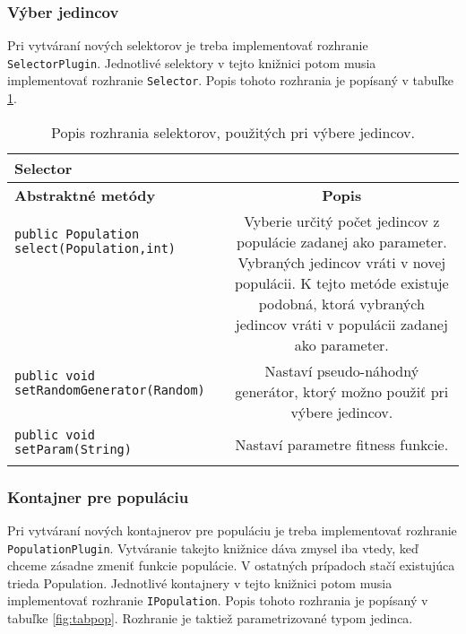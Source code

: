\subsubsection*{Výber jedincov}
Pri vytváraní nových selektorov je treba implementovať rozhranie \verb|SelectorPlugin|. Jednotlivé selektory v tejto knižnici potom musia implementovať rozhranie \verb|Selector|. Popis tohoto rozhrania je popísaný v tabuľke \ref{fig:tabsel}.

\begin{table}
\centering
\begin{tabular}{|l|c|}
\hline
\textbf{Selector} & \\
\hline\hline
\textbf{Abstraktné metódy} & \textbf{Popis} \\
\hline
\verb|public Population select(Population,int)| & \multirow{9}{5cm}{Vyberie určitý počet jedincov z populácie zadanej ako parameter. Vybraných jedincov vráti v novej populácii. K tejto metóde existuje podobná, ktorá vybraných jedincov vráti v populácii zadanej ako parameter.} \\
& \\
& \\
& \\
& \\
& \\
& \\
& \\
& \\
\hline
\verb|public void setRandomGenerator(Random)| & \multirow{3}{5cm}{Nastaví pseudo-náhodný generátor, ktorý možno použiť pri výbere jedincov.} \\
& \\
& \\
\hline
\verb|public void setParam(String)| & \multirow{2}{5cm}{Nastaví parametre fitness funkcie.} \\
& \\
\hline
\end{tabular}
\caption{Popis rozhrania selektorov, použitých pri výbere jedincov.}\label{fig:tabsel}
\end{table}

\subsubsection*{Kontajner pre populáciu}
Pri vytváraní nových kontajnerov pre populáciu je treba implementovať rozhranie \verb|PopulationPlugin|. Vytváranie takejto knižnice dáva zmysel iba vtedy, keď chceme zásadne zmeniť funkcie populácie. V ostatných prípadoch stačí existujúca trieda Population. Jednotlivé kontajnery v tejto knižnici potom musia implementovať rozhranie \verb|IPopulation|. Popis tohoto rozhrania je popísaný v tabuľke \ref{fig:tabpop}. Rozhranie je taktiež parametrizované typom jedinca.

